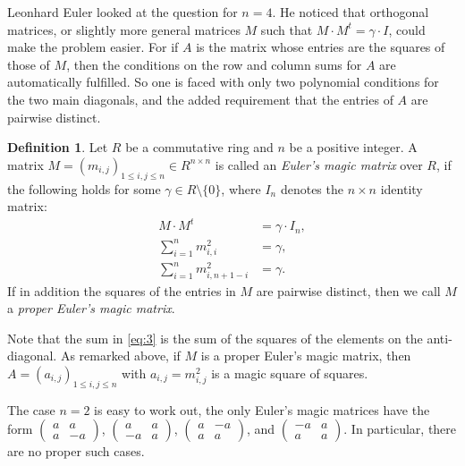 \documentclass[12pt]{amsart}
\theoremstyle{definition}
\newtheorem{definition}[theorem]{Definition}
\newcommand*{\set}[1]{\{#1\}}
\begin{document}
Leonhard Euler looked at the question for $n=4$. He noticed that
orthogonal matrices, or slightly more general matrices $M$ such that
$M\cdot M^t=\gamma\cdot I$, could make the problem easier. For if $A$
is the matrix whose entries are the squares of those of $M$, then the
conditions on the row and column sums for $A$ are automatically
fulfilled. So one is faced with only two polynomial conditions for the
two main diagonals, and the added requirement that the entries of $A$
are pairwise distinct.
\begin{definition}\label{def:emm}
  Let $R$ be a commutative ring and $n$ be a positive integer. A
  matrix $M=(m_{i,j})_{1\le i, j\le n}\in R^{n\times n}$ is called an
  \emph{Euler's magic matrix} over $R$, if the following holds for
  some $\gamma\in R\setminus\set{0}$, where $I_n$ denotes the
  $n\times n$ identity matrix:
  \begin{align}
    \label{eq:1}
    M\cdot M^t &= \gamma\cdot I_n,\\
    \sum_{i=1}^nm_{i,i}^2 &= \gamma,\label{eq:2}\\
    \sum_{i=1}^nm_{i,n+1-i}^2 &= \gamma.\label{eq:3}
  \end{align}
  If in addition the squares of the entries in $M$ are pairwise
  distinct, then we call $M$ a \emph{proper Euler's magic matrix}.
\end{definition}
Note that the sum in \eqref{eq:3} is the sum of the squares of the
elements on the anti-diagonal. As remarked above, if $M$ is a proper
Euler's magic matrix, then $A=(a_{i,j})_{1\le i,j\le n}$ with
$a_{i,j}=m_{i,j}^2$ is a magic square of squares.

The case $n=2$ is easy to work out, the only Euler's magic matrices
have the form $\begin{pmatrix}a&a\\a&-a\end{pmatrix}$,
$\begin{pmatrix}a&a\\-a&a\end{pmatrix}$,
$\begin{pmatrix}a&-a\\a&a\end{pmatrix}$, and
$\begin{pmatrix}-a&a\\a&a\end{pmatrix}$. In particular, there are no
proper such cases.
\end{document}
